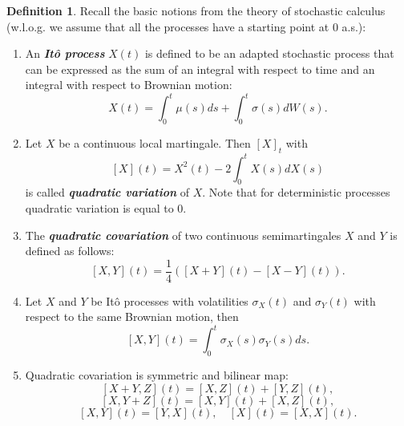 \documentclass[a4paper,11pt]{article}
\theoremstyle{plain}
\theoremstyle{definition}
\newtheorem{defn}[thm]{Definition}
\newcommand{\define}[1]{\textit{\textbf{#1}}}
\begin{document}
	\begin{defn} \label{stoch calc notions}
		Recall the basic notions from the theory of stochastic calculus (w.l.o.g. we assume that all the processes have a starting point at $0$ a.s.):
		\begin{enumerate}
			\item An \define{Itô process} $X(t)$ is defined to be an adapted stochastic process that can be expressed as the sum of an integral with respect to time and an integral with respect to Brownian motion:
			\[ X(t) = \int_{0}^{t} \mu(s) ds + \int_{0}^{t} \sigma(s) dW(s). \]
			\item Let $X$ be a continuous local martingale. Then $[X]_t$ with
			\[ [X](t) = X^2(t) - 2 \int_0^t X(s)dX(s) \]
			is called \define{quadratic variation} of $X$. Note that for deterministic processes quadratic variation is equal to $0$.
			\item The \define{quadratic covariation} of two continuous semimartingales $X$ and $Y$ is defined as follows:
			\[ [X, Y](t) = \frac{1}{4}([X + Y](t) - [X-Y](t)). \]
			\item Let $X$ and $Y$ be Itô processes with volatilities ${\sigma_X}(t)$ and ${\sigma_Y}(t)$ with respect to the same Brownian motion, then
			\[ [X, Y](t) = \int_0^t {\sigma_X}(s){\sigma_Y}(s) ds. \]
			\item Quadratic covariation is symmetric and bilinear map:
			\[ [X + Y, Z](t) = [X, Z](t) + [Y, Z](t), \]
			\[ [X, Y + Z](t) = [X, Y](t) + [X, Z](t), \]
			\[ [X, Y](t) = [Y, X](t), \quad [X](t) = [X, X](t). \]
		\end{enumerate}
	\end{defn}
	
\end{document}
